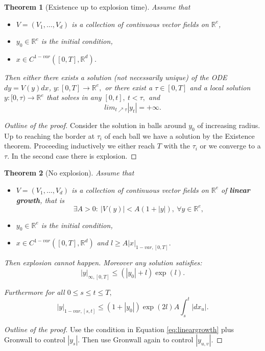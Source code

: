 \documentclass{article}
\newcommand{\R}{\mathbb{R}}
\newtheorem{theorem}{Theorem}
\begin{document}
\begin{theorem}[Existence up to explosion time]
      Assume that
    \begin{itemize}
        \item $V = (V_1, \ldots, V_d)$ is a collection of continuous vector fields on $\R^e$,
        \item $y_0 \in \R^e$ is the initial condition,
        \item $x \in C^{1-var}([0,T], \R^d)$.
    \end{itemize}
    Then either there exists a solution (not necessarily unique) of the ODE $dy = V(y)dx$, $y:[0,T] \rightarrow \R^e,$
    or there exist a $\tau \in [0,T]$ and a local solution $y:[0,\tau) \rightarrow \R^e$ that solves in any $[0,t], \ t < \tau,$ and 
 \begin{equation}
    lim_{t \nearrow \tau} |y_t| = +\infty.
 \end{equation}
\end{theorem}
\begin{proof}[Outline of the proof]
    Consider the solution in balls around $y_0$ of increasing radius. Up to reaching the border at $\tau_i$ of each ball we have a solution by the Existence theorem.
    Proceeding inductively we either reach $T$ with the $\tau_i$ or we converge to a $\tau.$ In the second case there is explosion.
\end{proof}

\begin{theorem}[No explosion]
 Assume that
    \begin{itemize}
        \item $V = (V_1, \ldots, V_d)$ is a collection of continuous vector fields on $\R^e$ of \textbf{linear growth}, that is
        \begin{equation}\label{eq:lineargrowth}
             \exists A > 0:\ |V(y)| < A (1 + |y|),\ \forall y \in \R^e,
        \end{equation}
        \item $y_0 \in \R^e$ is the initial condition,
        \item $x \in C^{1-var}([0,T], \R^d)$ and $l \geq A |x|_{1-var,[0,T]}.$
    \end{itemize}   
    Then explosion cannot happen. Moreover any solution satisfies:
    \begin{equation}
        |y|_{\infty, [0,T]} \leq (|y_0| + l) \exp(l).
    \end{equation}

    Furthermore for all $0 \leq s \leq t \leq T,$ 
    \begin{equation}
        |y|_{1-var, [s,t]} \leq (1 + |y_0|) \exp(2l) A \int_s^t |dx_u|.
    \end{equation}
\end{theorem}
\begin{proof}[Outline of the proof]
    Use the condition in Equation \eqref{eq:lineargrowth} plus Gronwall to control $|y_s|.$
    Then use Gronwall again to control $|y_{u,v}|.$
\end{proof}
\end{document}
